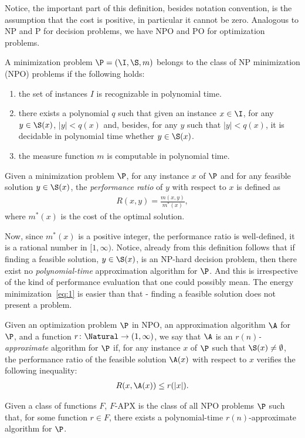 Notice, the important part of this definition, besides notation convention, is the assumption that the cost is positive, in particular it cannot be zero.
Analogous to NP and P for decision problems, we have NPO and PO for optimization problems.
%
\begin{definition} A minimization problem $\P = (\I,\S,m)$ belongs to the class of NP minimization (NPO) problems if the following holds:
\begin{enumerate}
\item the set of instances $I$ is recognizable in polynomial time.
\item there exists a polynomial $q$ such that given an instance $x\in\I$, for any $y\in \S(x)$, $|y| < q(x)$ and, besides, for any $y$ such that $|y| < q(x)$, it is decidable in polynomial time whether $y\in\S(x)$.
\item the measure function $m$ is computable in polynomial time.
\end{enumerate}
\end{definition}

%
\begin{definition}Given a minimization problem $\P$, for any instance $x$ of $\P$ and for any feasible solution $y\in\S(x)$, the {\em performance ratio} of $y$ with respect to $x$ is defined as
\begin{align}
R(x,y) = \frac{m(x,y)}{m^*(x)},
\end{align}
where $m^*(x)$ is the cost of the optimal solution.
\end{definition}
Now, since $m^*(x)$ is a positive integer, the performance ratio is well-defined, it is a rational number in $[1,\infty)$.
Notice, already from this definition follows that if finding a feasible solution, \eg $y\in\S(x)$, is an NP-hard decision problem, then there exist no {\em polynomial-time} approximation algorithm for $\P$. And this is irrespective of the kind of performance evaluation that one could possibly mean. The energy minimization~\eqref{eq:1} is easier than that - finding a feasible solution does not present a problem.
\begin{definition}Given an optimization problem $\P$ in NPO, an approximation algorithm $\A$ for $\P$, and a function $r\colon \Natural \to (1,\infty)$, we say that $\A$ is an {\em $r(n)$-approximate} algorithm for $\P$ if, for any instance $x$ of $\P$ such that $\S(x) \neq \emptyset$, the performance ratio of the feasible solution $\A(x)$ with respect to $x$ verifies the following inequality:
\begin{align}
R(x,\A(x)) \leq r(|x|).
\end{align}
\end{definition}
\begin{definition}\label{def:F-APX} Given a class of functions $F$, $F$-APX is the class of all NPO problems $\P$ such that, for some function $r\in F$, there exists a polynomial-time $r(n)$-approximate algorithm for $\P$.
\end{definition}

